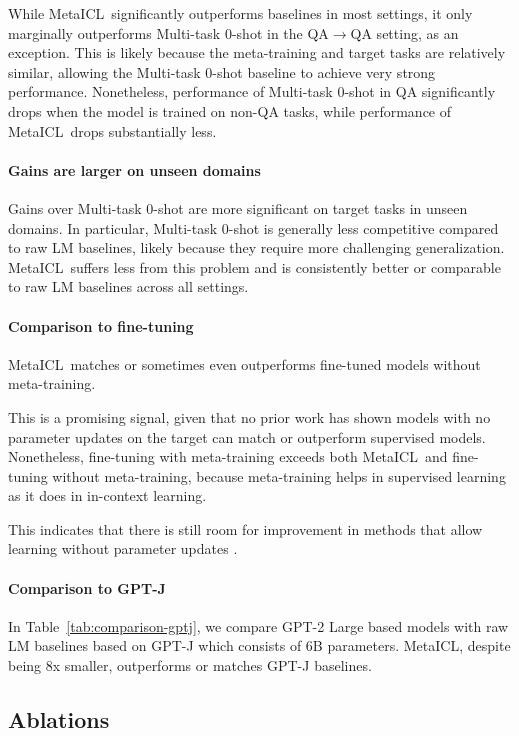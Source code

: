 While MetaICL\ significantly outperforms baselines in most settings, it only marginally outperforms Multi-task 0-shot in the QA$\rightarrow$QA setting, as an exception. This is likely because the meta-training and target tasks are relatively similar, allowing the Multi-task 0-shot baseline to achieve very strong performance. Nonetheless, performance of Multi-task 0-shot in QA significantly drops when the model is trained on non-QA tasks, while performance of MetaICL\ drops substantially less.

\paragraph{Gains are larger on unseen domains} Gains over Multi-task 0-shot are more significant on target tasks in unseen domains. In particular, Multi-task 0-shot is generally less competitive compared to raw LM baselines, likely because they require more challenging generalization.
MetaICL\ suffers less from this problem and is consistently better or comparable to raw LM baselines across all settings.

\paragraph{Comparison to fine-tuning}
MetaICL\ matches or sometimes even outperforms fine-tuned models without meta-training.

This is a promising signal, given that no prior work has shown models with no parameter updates on the target can match or outperform supervised models. Nonetheless, fine-tuning with meta-training exceeds both MetaICL\ and fine-tuning without meta-training, because meta-training helps in supervised learning as it does in in-context learning.

This indicates that there is still room for improvement in methods that allow learning without parameter updates .

\paragraph{Comparison to GPT-J} In Table~\ref{tab:comparison-gptj}, we compare GPT-2 Large based models with raw LM baselines based on GPT-J which consists of 6B parameters. MetaICL, despite being 8x smaller, outperforms or matches GPT-J baselines. 

\subsection{Ablations}\label{subsec:ablations}


